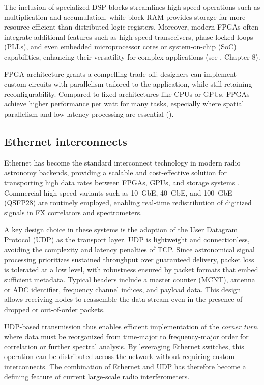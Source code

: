 The inclusion of specialized DSP blocks streamlines high-speed operations such as multiplication and accumulation, while block RAM provides storage far more resource-efficient than distributed logic registers. Moreover, modern FPGAs often integrate additional features such as high-speed transceivers, phase-locked loops (PLLs), and even embedded microprocessor cores or system-on-chip (SoC) capabilities, enhancing their versatility for complex applications (see \cite{zhang2018fpga}, Chapter 8).

FPGA architecture grants a compelling trade-off: designers can implement custom circuits with parallelism tailored to the application, while still retaining reconfigurability. Compared to fixed architectures like CPUs or GPUs, FPGAs achieve higher performance per watt for many tasks, especially where spatial parallelism and low-latency processing are essential (\cite{kuon2008fpga,zhang2018fpga}).

\subsection{Ethernet interconnects}

Ethernet has become the standard interconnect technology in modern radio astronomy backends, providing a scalable and cost-effective solution for transporting high data rates between FPGAs, GPUs, and storage systems \citep{Price_2020}. Commercial high-speed variants such as 10~GbE, 40~GbE, and 100~GbE (QSFP28) are routinely employed, enabling real-time redistribution of digitized signals in FX correlators and spectrometers.  

A key design choice in these systems is the adoption of the User Datagram Protocol (UDP) as the transport layer. UDP is lightweight and connectionless, avoiding the complexity and latency penalties of TCP. Since astronomical signal processing prioritizes sustained throughput over guaranteed delivery, packet loss is tolerated at a low level, with robustness ensured by packet formats that embed sufficient metadata. Typical headers include a master counter (MCNT), antenna or ADC identifier, frequency channel indices, and payload data. This design allows receiving nodes to reassemble the data stream even in the presence of dropped or out-of-order packets.  

UDP-based transmission thus enables efficient implementation of the \emph{corner turn}, where data must be reorganized from time-major to frequency-major order for correlation or further spectral analysis. By leveraging Ethernet switches, this operation can be distributed across the network without requiring custom interconnects. The combination of Ethernet and UDP has therefore become a defining feature of current large-scale radio interferometers.  


